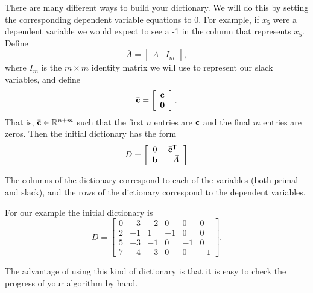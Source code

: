 There are many different ways to build your dictionary.
We will do this by setting the corresponding dependent variable equations to 0. For example, if $x_5$ were a dependent variable we would expect to see a -1 in the column that represents $x_5$.
Define \[\bar{A} = \left[\begin{array}{cc} A & I_m \end{array}\right],\]
where $I_m$ is the $m \times m$ identity matrix we will use to represent our slack variables, and define
\[\bar{\mathbf{c}} = \left[\begin{array}{c}\mathbf{c}\\ \mathbf{0}\end{array}\right].\]
That is, $\bar{\mathbf{c}} \in \mathbb{R}^{n+m}$ such that the first $n$ entries are $\mathbf{c}$ and the final $m$ entries are zeros.
Then the initial dictionary has the form
\begin{equation}
D =
\left[\begin{array}{ccc}
0  & \bar{\mathbf{c}}^{\mathsf T} \\
\mathbf{b} &  -\bar{A}
\end{array}\right]
\label{eqn:hand_tab}
\end{equation}

The columns of the dictionary correspond to each of the variables (both primal and slack), and the rows of the dictionary correspond to the dependent variables.

For our example the initial dictionary is
\begin{equation*}
D = \begin{bmatrix}
    0 & -3 & -2 & 0 & 0 & 0\\
    2 & -1 & 1 & -1 & 0 & 0\\
    5 & -3 & -1 & 0 & -1 & 0\\
    7 & -4 & -3 & 0 & 0 & -1
    \end{bmatrix}.
\end{equation*}

The advantage of using this kind of dictionary is that it is easy to check the progress of your algorithm by hand.

